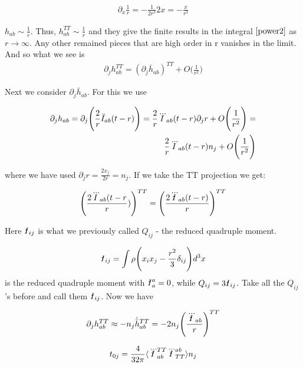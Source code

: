 \documentclass[11pt]{article}
\newcommand{\rqm}{{\declareslashed{}{\text{-}}{0.04}{0}{I}\slashed{I}}}
\begin{document}
\begin{align}
\partial_x\frac{1}{r} = -\frac{1}{2r^3}2x = -\frac{x}{r^3}
\end{align}

$h_{ab} \sim \frac{1}{r}$. Thus, $h^{TT}_{ab} \sim \frac{1}{r}$ and they give the finite results in the integral $\ref{power2}$ as $r \rightarrow \infty$. Any other remained pieces that are high order in r vanishes in the limit. And so what we see is
\begin{align}
\partial_j h^{TT}_{ab} = (\partial_j \bar{h}_{ab})^{TT} + O\Bigg(\frac{1}{r^2}\Bigg)
\end{align}

\pagebreak

Next we consider $\partial_j \bar{h}_{ab}$. For this we use 

\begin{align}
\partial_j h_{ab} = \partial_j \Bigg(\frac{2}{r}\ddot{I}_{ab}(t-r)\Bigg) = \frac{2}{r}\dddot{I}_{ab}(t-r)\partial_j r +  O\Bigg(\frac{1}{r^2}\Bigg) = \notag \\ 
\frac{2}{r}\dddot{I}_{ab}(t-r)n_j + O\Bigg(\frac{1}{r^2}\Bigg)
\end{align}

where we have used $\partial_j r = \frac{2x_j}{2r} = n_j$. If we take the TT projection we get:

\begin{align}
\Bigg(\frac{2\dddot{I}_{ab}(t-r}{r})\Bigg)^{TT} = \Bigg(\frac{2{\dddot{\rqm}}_{ab}(t-r)}{r}\Bigg)^{TT}
\end{align}

Here $\rqm_{ij}$ is what we previously called $Q_{ij}$ - the reduced quadruple moment.

\begin{align}
\rqm_{ij} = \int \rho \Bigg(x_i x_j - \frac{r^2}{3}\delta_{ij}\Bigg)d^3x
\end{align}
is the reduced quadruple moment with $\rqm^a_a = 0$, while $Q_{ij} = 3\rqm_{ij}$. Take all the $Q_{ij}$'s before and call them $\rqm_{ij}$. Now we have

\begin{align}
\partial_j h^{TT}_{ab} \approx - n_j \dot{\bar{h}}^{TT}_{ab} = -2n_j \Bigg(\frac{\dddot{\rqm}_{ab}}{r}\Bigg)^{TT}
\end{align}


\begin{align}
t_{0j} = \frac{4}{32\pi}\langle \dddot{\rqm}^{TT}_{ab} \dddot{\rqm}^{ab}_{TT} \rangle n_j \label{t_0j}
\end{align}
\end{document}
